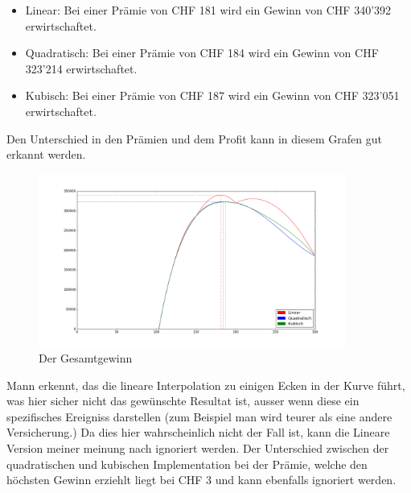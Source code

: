 \documentclass[10pt]{article}         %
\begin{document}
\begin{itemize}
    \item Linear: Bei einer Prämie von CHF 181 wird ein Gewinn von CHF 340'392 erwirtschaftet.
    \item Quadratisch: Bei einer Prämie von CHF 184 wird ein Gewinn von CHF 323'214 erwirtschaftet.
    \item Kubisch: Bei einer Prämie von CHF 187 wird ein Gewinn von CHF 323'051 erwirtschaftet.
\end{itemize}
Den Unterschied in den Prämien und dem Profit kann in diesem Grafen gut erkannt werden.
\begin{figure}[!ht]
    \centering
    \includegraphics[width=0.9\textwidth]{profit}
    \caption{Der Gesamtgewinn}\label{fig:figure1}
\end{figure}
Mann erkennt, das die lineare Interpolation zu einigen Ecken in der Kurve führt, was hier sicher nicht das gewünschte Resultat ist, ausser wenn diese ein spezifisches Ereigniss darstellen (zum Beispiel man wird teurer als eine andere Versicherung.) Da dies hier wahrscheinlich nicht der Fall ist, kann die Lineare Version meiner meinung nach ignoriert werden. Der Unterschied zwischen der quadratischen und kubischen Implementation bei der Prämie, welche den höchsten Gewinn erziehlt liegt bei CHF 3 und kann ebenfalls ignoriert werden.
\end{document}
